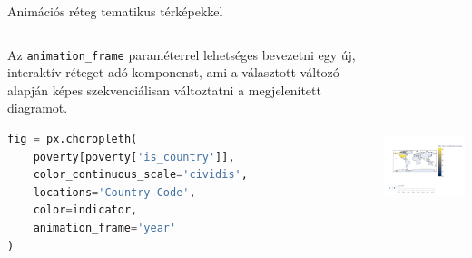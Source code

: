 \documentclass[english, aspectratio=169]{beamer}
\begin{document}
	\begin{frame}[fragile]{Animációs réteg tematikus térképekkel}
		\begin{columns}
			\begin{column}{.5\textwidth}
				Az \texttt{animation\_frame} paraméterrel lehetséges bevezetni egy új, interaktív réteget adó komponenst, ami a választott változó alapján képes szekvenciálisan változtatni a megjelenített diagramot.\par\medskip
				\begin{lstlisting}[language=python]
fig = px.choropleth(
	poverty[poverty['is_country']],
	color_continuous_scale='cividis',
	locations='Country Code',
	color=indicator,
	animation_frame='year'
)				
				\end{lstlisting}
			\end{column}
			\begin{column}{.5\textwidth}
				\begin{center}
					\includegraphics[width=7cm, height=7cm, keepaspectratio]{images/scatter_21.png}
				\end{center}
			\end{column}
		\end{columns}
	\end{frame}
	
\end{document}
